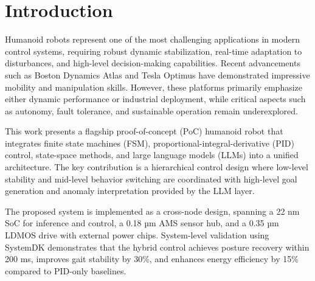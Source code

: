\section{Introduction}
Humanoid robots represent one of the most challenging applications in modern control systems,
requiring robust dynamic stabilization, real-time adaptation to disturbances,
and high-level decision-making capabilities.
Recent advancements such as Boston Dynamics Atlas and Tesla Optimus
have demonstrated impressive mobility and manipulation skills.
However, these platforms primarily emphasize either dynamic performance
or industrial deployment, while critical aspects such as autonomy,
fault tolerance, and sustainable operation remain underexplored.

This work presents a flagship proof-of-concept (PoC) humanoid robot
that integrates finite state machines (FSM), proportional-integral-derivative (PID) control,
state-space methods, and large language models (LLMs) into a unified architecture.
The key contribution is a hierarchical control design where low-level stability
and mid-level behavior switching are coordinated with high-level goal generation
and anomaly interpretation provided by the LLM layer.

The proposed system is implemented as a cross-node design,
spanning a 22 nm SoC for inference and control, a 0.18 µm AMS sensor hub,
and a 0.35 µm LDMOS drive with external power chips.
System-level validation using SystemDK demonstrates that the hybrid control
achieves posture recovery within 200 ms, improves gait stability by 30\%,
and enhances energy efficiency by 15\% compared to PID-only baselines.
